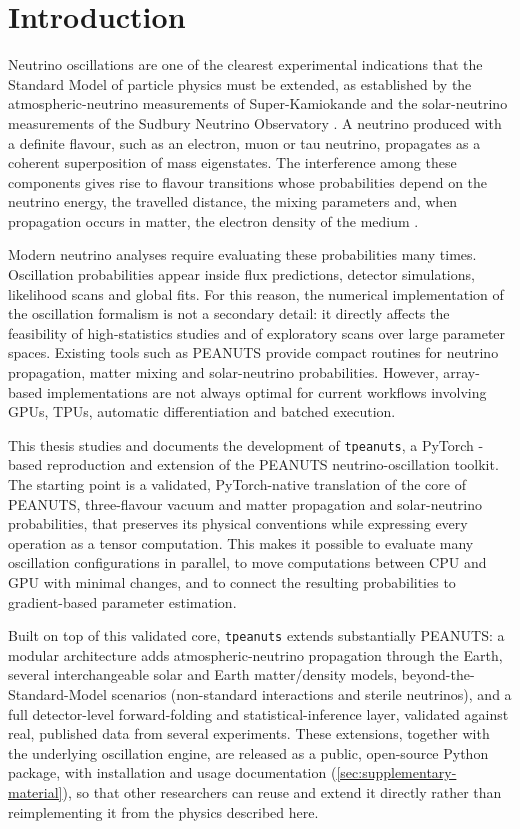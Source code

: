 \section{Introduction}

Neutrino oscillations are one of the clearest experimental indications that the Standard Model of particle physics must be extended, as established by the atmospheric-neutrino measurements of Super-Kamiokande and the solar-neutrino measurements of the Sudbury Neutrino Observatory \parencite{SuperKamiokande1998,SNO2002}. A neutrino produced with a definite flavour, such as an electron, muon or tau neutrino, propagates as a coherent superposition of mass eigenstates. The interference among these components gives rise to flavour transitions whose probabilities depend on the neutrino energy, the travelled distance, the mixing parameters and, when propagation occurs in matter, the electron density of the medium \parencite{Giunti2007,Wolfenstein1978,MikheyevSmirnov1985}.

Modern neutrino analyses require evaluating these probabilities many times. Oscillation probabilities appear inside flux predictions, detector simulations, likelihood scans and global fits. For this reason, the numerical implementation of the oscillation formalism is not a secondary detail: it directly affects the feasibility of high-statistics studies and of exploratory scans over large parameter spaces. Existing tools such as PEANUTS \parencite{Gonzalo2024} provide compact routines for neutrino propagation, matter mixing and solar-neutrino probabilities. However, array-based implementations are not always optimal for current workflows involving GPUs, TPUs, automatic differentiation and batched execution.

This thesis studies and documents the development of \texttt{tpeanuts}, a PyTorch \parencite{Paszke2019}-based reproduction and extension of the PEANUTS neutrino-oscillation toolkit. The starting point is a validated, PyTorch-native translation of the core of PEANUTS, three-flavour vacuum and matter propagation and solar-neutrino probabilities, that preserves its physical conventions while expressing every operation as a tensor computation. This makes it possible to evaluate many oscillation configurations in parallel, to move computations between CPU and GPU with minimal changes, and to connect the resulting probabilities to gradient-based parameter estimation.

Built on top of this validated core, \texttt{tpeanuts} extends substantially PEANUTS: a modular architecture adds atmospheric-neutrino propagation through the Earth, several interchangeable solar and Earth matter/density models, beyond-the-Standard-Model scenarios (non-standard interactions and sterile neutrinos), and a full detector-level forward-folding and statistical-inference layer, validated against real, published data from several experiments. These extensions, together with the underlying oscillation engine, are released as a public, open-source Python package, with installation and usage documentation (\cref{sec:supplementary-material}), so that other researchers can reuse and extend it directly rather than reimplementing it from the physics described here.


